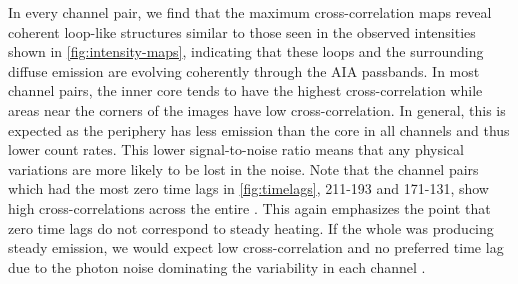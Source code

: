 In every channel pair, we find that the maximum cross-correlation maps reveal coherent loop-like structures similar to those seen in the observed intensities shown in \autoref{fig:intensity-maps}, indicating that these loops and the surrounding diffuse emission are evolving coherently through the AIA passbands.
In most channel pairs, the inner core tends to have the highest cross-correlation while areas near the corners of the images have low cross-correlation.
In general, this is expected as the periphery has less emission than the core in all channels and thus lower count rates.
This lower signal-to-noise ratio means that any physical variations are more likely to be lost in the noise.
Note that the channel pairs which had the most zero time lags in \autoref{fig:timelags}, 211-193 and 171-131, show high cross-correlations across the entire \AR{}.
This again emphasizes the point that zero time lags do not correspond to steady heating.
If the whole \AR{} was producing steady emission, we would expect low cross-correlation and no preferred time lag due to the photon noise dominating the variability in each channel \citep{viall_signatures_2016}.
